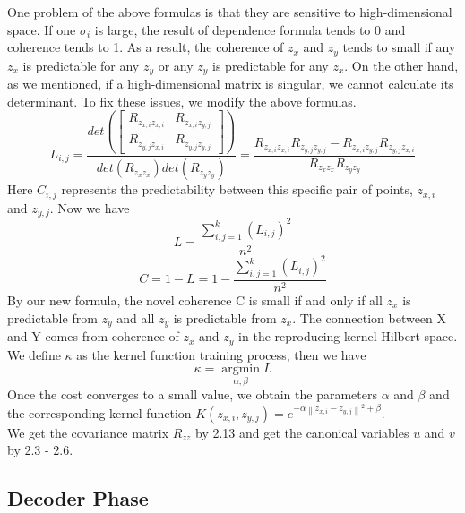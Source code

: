 \documentclass[12pt]{report} %
\newcommand{\norm}[1]{\left\lVert #1 \right\rVert}
\begin{document}
One problem of the above formulas is that they are sensitive to high-dimensional space. If one \(\sigma_i\) is large, the result of dependence formula tends to 0 and coherence tends to 1. As a result, the coherence of $z_x$ and $z_y$ tends to small if any $z_x$ is predictable for any $z_y$ or any $z_y$ is predictable for any $z_x$. On the other hand, as we mentioned, if a high-dimensional matrix is singular, we cannot calculate its determinant. To fix these issues, we modify the above formulas.
\begin{equation}
L_{i,j}=\frac{det(\begin{bmatrix}
	R_{z_{x,i}z_{x,i}} & R_{z_{x,i}z_{y,j}} \\
	R_{z_{y,j}z_{x,i}} & R_{z_{y,j}z_{y,j}}
	\end{bmatrix})}
{det(R_{z_{x}z_{x}})det(R_{z_{y}z_{y}})}=
\frac{R_{z_{x,i}z_{x,i}}R_{z_{y,j}z_{y,j}}-R_{z_{x,i}z_{y,j}}R_{z_{y,j}z_{x,i}}}
{R_{z_{x}z_{x}}R_{z_{y}z_{y}}}
\end{equation}
Here \(C_{i,j}\) represents the predictability between this specific pair of points, $z_{x,i}$ and $z_{y,j}$. Now we have
\begin{equation}
L=\frac{\sum_{i,j=1}^{k}(L_{i,j})^2}{n^2}
\end{equation}
\begin{equation}
C=1-L=1-\frac{\sum_{i,j=1}^{k}(L_{i,j})^2}{n^2}
\end{equation}
By our new formula, the novel coherence C is small if and only if all $z_x$ is predictable from $z_y$ and all $z_y$ is predictable from $z_x$. The connection between X and Y comes from coherence of $z_x$ and $z_y$ in the reproducing kernel Hilbert space. We define $\kappa$ as the kernel function training process, then we have
\begin{equation}
\kappa=\operatorname*{argmin}_{\alpha,\beta} L
\end{equation}
Once the cost converges to a small value, we obtain the parameters $\alpha$ and $\beta$ and the corresponding kernel function $K(z_{x,i},z_{y,j})=e^{-\alpha \norm{z_{x,i}-z_{y,j}}^2 + \beta}$.\\
We get the covariance matrix $R_{zz}$ by 2.13 and get the canonical variables $u$ and $v$ by 2.3 - 2.6.

\subsection{Decoder Phase}
\end{document}
